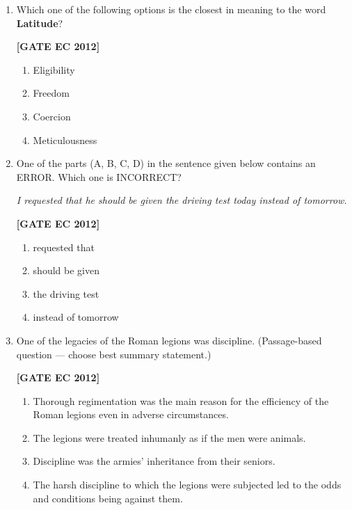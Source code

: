 \documentclass[12pt]{article}
\begin{document}
\begin{enumerate}[leftmargin=1.0em, label=\textbf{Q.\arabic*.}, itemsep=2em]
\begin{enumerate}[leftmargin=2.5em, label=\textbf{Q.\arabic*.}, itemsep=2em, start=46]
\item Which one of the following options is the closest in meaning to the word \textbf{Latitude}?

\noindent \textbf{[GATE EC 2012]}
\begin{multicols}{2}
    \begin{enumerate}[label=\alph*.]
        \item Eligibility
        \item Freedom
        \item Coercion
        \item Meticulousness
    \end{enumerate}
\end{multicols}

\item One of the parts (A, B, C, D) in the sentence given below contains an ERROR. Which one is INCORRECT?

\emph{I requested that he should be given the driving test today instead of tomorrow.}

\noindent \textbf{[GATE EC 2012]}
\begin{multicols}{2}
    \begin{enumerate}[label=\alph*.]
        \item requested that
        \item should be given
        \item the driving test
        \item instead of tomorrow
    \end{enumerate}
\end{multicols}

\item One of the legacies of the Roman legions was discipline. (Passage-based question — choose best summary statement.)

\noindent \textbf{[GATE EC 2012]}
\begin{multicols}{2}
    \begin{enumerate}[label=\alph*.]
        \item Thorough regimentation was the main reason for the efficiency of the Roman legions even in adverse circumstances.
        \item The legions were treated inhumanly as if the men were animals.
        \item Discipline was the armies’ inheritance from their seniors.
        \item The harsh discipline to which the legions were subjected led to the odds and conditions being against them.
    \end{enumerate}
\end{multicols}


\end{enumerate}
\end{enumerate}
\end{document}
